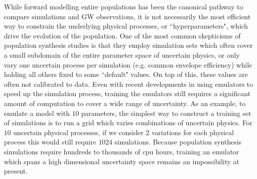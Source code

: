 \documentclass[twocolumn]{aastex631}
\newcommand{\kw}[1]{{\color{rb4}[KW: #1 ]}}
\newcommand{\kb}[1]{\textcolor{pink}{#1}}
\begin{document}

While forward modelling entire populations has been the canonical pathway to compare simulations and GW observations,
it is not necessarily the most efficient way to constrain the underlying physical processes, or ``hyperparameters", which drive the evolution of the population.
One of the most common skepticisms of population synthesis studies is that they employ simulation sets which often 
cover a small subdomain of the entire parameter space of uncertain physics, or only vary one uncertain process per simulation
(e.g. common envelope efficiency) while holding all others fixed to some ``default" values.
On top of this, these values are often not calibrated to data.
Even with recent developments in using emulators to speed up the simulation process, training the emulators 
still requires a significant amount of computation to cover a wide range of uncertainty.
As an example, to emulate a model with $10$ parameters, the simplest way to construct a training set of simulations is to 
run a grid which varies combinations of uncertain physics.
For $10$ uncertain physical processes, if we consider $2$ variations for each physical process 
this would still require $1024$ simulations.
Because population synthesis simulations require hundreds to thousands of cpu hours,
training an emulator which spans a high dimensional uncertainty space remains an impossibility at present.
\end{document}
